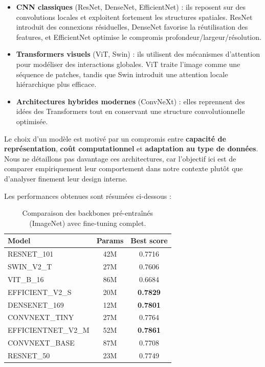 \documentclass[journal,twocolumn]{IEEEtran}
\begin{document}
\begin{itemize}
    \item \textbf{CNN classiques} (ResNet, DenseNet, EfficientNet) : ils reposent sur des convolutions locales et exploitent fortement les structures spatiales. ResNet introduit des connexions résiduelles, DenseNet favorise la réutilisation des features, et EfficientNet optimise le compromis profondeur/largeur/résolution.
    
    \item \textbf{Transformers visuels} (ViT, Swin) : ils utilisent des mécanismes d’attention pour modéliser des interactions globales. ViT traite l’image comme une séquence de patches, tandis que Swin introduit une attention locale hiérarchique plus efficace.
    
    \item \textbf{Architectures hybrides modernes} (ConvNeXt) : elles reprennent des idées des Transformers tout en conservant une structure convolutionnelle optimisée.
\end{itemize}

Le choix d’un modèle est motivé par un compromis entre \textbf{capacité de représentation}, \textbf{coût computationnel} et \textbf{adaptation au type de données}. Nous ne détaillons pas davantage ces architectures, car l’objectif ici est de comparer empiriquement leur comportement dans notre contexte plutôt que d’analyser finement leur design interne.

Les performances obtenues sont résumées ci-dessous :

\begin{table}[h]
\centering
\caption{Comparaison des backbones pré-entraînés (ImageNet) avec fine-tuning complet.}
\begin{tabular}{|l|c|c|}
\hline
\textbf{Model} & \textbf{Params} & \textbf{Best score} \\
\hline
RESNET\_101        & 42M & 0.7716 \\
SWIN\_V2\_T        & 27M & 0.7606 \\
VIT\_B\_16         & 86M & 0.6684 \\
EFFICIENT\_V2\_S   & 20M & \textbf{\textbf{0.7829}} \\
DENSENET\_169      & 12M & \textbf{0.7801} \\
CONVNEXT\_TINY     & 27M & 0.7764 \\
EFFICIENTNET\_V2\_M& 52M & \textbf{\textbf{\textbf{0.7861}}} \\
CONVNEXT\_BASE     & 87M & 0.7708 \\
RESNET\_50         & 23M & 0.7749 \\
\hline
\end{tabular}
\end{table}
\end{document}
